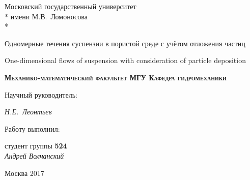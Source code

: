 \documentclass[a4paper,12pt]{article}
\begin{document}
\begin{titlepage}
\newpage

\begin{center}
\vspace{1.5cm}
Московский государственный университет \\*
имени М.В.~Ломоносова \\*
\hrulefill
\end{center}


\vspace{7em}

\begin{center}
\Large Одномерные течения суспензии в пористой среде с учётом отложения частиц 
\end{center}

\vspace{1em}

\begin{center}
\Large One-dimensional flows of suspension with consideration of particle deposition
\end{center}

\vspace{2.5em}

\begin{center}
\textsc{\textbf{Механико-математический факультет МГУ \linebreak Кафедра гидромеханики}}
\end{center}

\vspace{3.5em}

\begin{flushright}
Научный руководитель:
\end{flushright}

\begin{flushright}
\large \textit{Н.Е.~Леонтьев}
\end{flushright}

\begin{flushright}
Работу выполнил:
\end{flushright}

\begin{flushright}
студент группы \textbf{524}\\
\vspace{1em}
\large \textit{Андрей Волчанский}\\
\end{flushright}

\vspace{\fill}

\begin{center}
Москва 2017
\end{center}

\end{titlepage}
\end{document}
